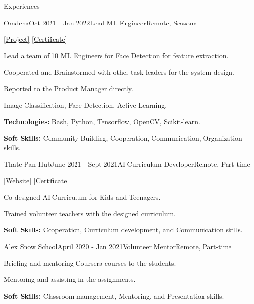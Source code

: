 \documentclass{resume} %
\begin{document}
\begin{rSection}{Experiences}
    \begin{rSubsection}{Omdena}{Oct 2021 - Jan 2022}{Lead ML Engineer}{Remote, Seasonal}
      \item \href{https://omdena.com/projects/ethnicity-awareness/}{[\underline{Project}]}
    \href{https://imgur.com/gallery/U67M3dM}{[\underline{Certificate}]}
      \item Lead a team of 10 ML Engineers for Face Detection for feature extraction.
        \item Cooperated and Brainstormed with other task leaders for the system design.
        \item Reported to the Product Manager directly.
        \item Image Classification, Face Detection, Active Learning.
        \item \textbf{Technologies:} Bash, Python, Tensorflow, OpenCV, Scikit-learn.
         \item \textbf{Soft Skills:} Community Building, Cooperation, Communication, Organization skills.
    \end{rSubsection}

    \begin{rSubsection}{Thate Pan Hub}{June 2021 - Sept 2021}{AI Curriculum Developer}{Remote, Part-time}
      \item \href{https://thatepanhub.org/}{[\underline{Website}]}
    \href{https://imgur.com/gallery/3AiGljT}{[\underline{Certificate}]}
       \item Co-designed AI Curriculum for Kids and Teenagers.
        \item Trained volunteer teachers with the designed curriculum.
        \item \textbf{Soft Skills:} Cooperation, Curriculum development, and Communication skills.
    \end{rSubsection}

    \begin{rSubsection}{Alex Snow School}{April 2020 - Jan 2021}{Volunteer Mentor}{Remote, Part-time}
       \item Briefing and mentoring Coursera courses to the students.
        \item Mentoring and assisting in the assignments.
        \item \textbf{Soft Skills:} Classroom management, Mentoring, and Presentation skills.
    \end{rSubsection}

\end{rSection}
\end{document}
